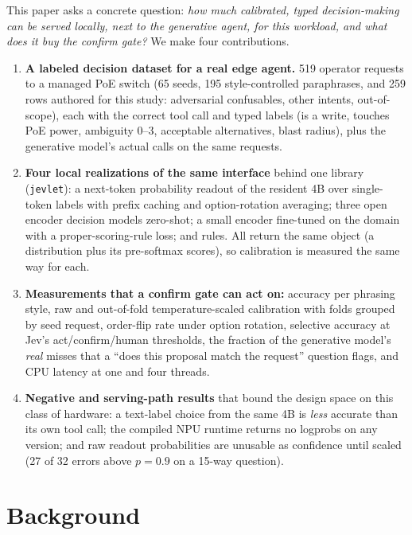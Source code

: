 \documentclass[11pt]{article}
\begin{document}
This paper asks a concrete question: \emph{how much calibrated, typed decision-making can be
served locally, next to the generative agent, for this workload, and what does it buy the
confirm gate?} We make four contributions.

\begin{enumerate}
\item \textbf{A labeled decision dataset for a real edge agent.} 519 operator requests to
  a managed PoE switch (65 seeds, 195 style-controlled paraphrases, and 259 rows authored
  for this study: adversarial confusables, other intents, out-of-scope), each with the correct
  tool call and typed labels (is a write, touches PoE power, ambiguity 0--3, acceptable
  alternatives, blast radius), plus the generative model's actual calls on the same requests.
\item \textbf{Four local realizations of the same interface} behind one library
  (\texttt{jevlet}): a next-token probability readout of the resident 4B over single-token labels
  with prefix caching and option-rotation averaging; three open encoder decision models
  zero-shot; a small encoder fine-tuned on the domain with a proper-scoring-rule loss; and
  rules. All return the same object (a distribution plus its pre-softmax scores), so calibration
  is measured the same way for each.
\item \textbf{Measurements that a confirm gate can act on:} accuracy per phrasing style,
  raw and out-of-fold temperature-scaled calibration with folds grouped by seed request,
  order-flip rate under option rotation, selective accuracy at Jev's act/confirm/human
  thresholds, the fraction of the generative model's \emph{real} misses that a
  ``does this proposal match the request'' question flags, and CPU latency at one and four threads.
\item \textbf{Negative and serving-path results} that bound the design space on this class of
  hardware: a text-label choice from the same 4B is \emph{less} accurate than its own tool call;
  the compiled NPU runtime returns no logprobs on any version; and raw readout probabilities
  are unusable as confidence until scaled (27 of 32 errors above $p=0.9$ on a 15-way question).
\end{enumerate}

\section{Background}
\end{document}
